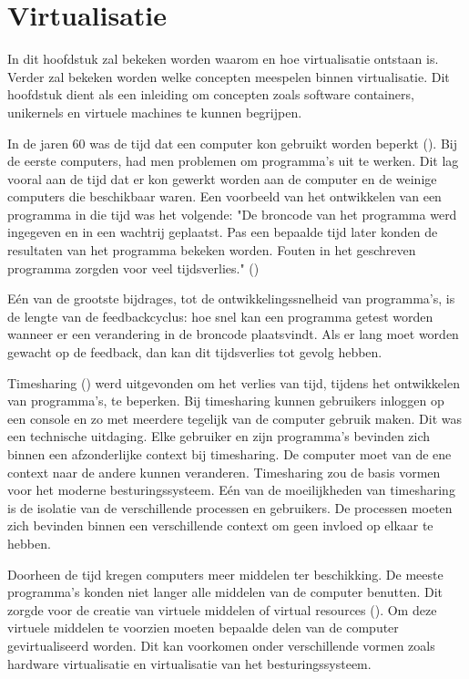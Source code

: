 \chapter{Virtualisatie}
\label{ch:virtualisatie}

In dit hoofdstuk zal bekeken worden waarom en hoe virtualisatie ontstaan is. Verder zal bekeken worden welke concepten meespelen binnen virtualisatie. Dit hoofdstuk dient als een inleiding om concepten zoals software containers, unikernels en virtuele machines te kunnen begrijpen.

In de jaren 60 was de tijd dat een computer kon gebruikt worden beperkt (\cite{conferences_modern_1968}). Bij de eerste computers, had men problemen om programma's uit te werken. Dit lag vooral aan de tijd dat er kon gewerkt worden aan de computer en de weinige computers die beschikbaar waren. Een voorbeeld van het ontwikkelen van een programma in die tijd was het volgende: "De broncode van het programma werd ingegeven en in een wachtrij geplaatst. Pas een bepaalde tijd later konden de resultaten van het programma bekeken worden. Fouten in het geschreven programma zorgden voor veel tijdsverlies." (\cite{conferences_modern_1968})

Eén van de grootste bijdrages, tot de ontwikkelingssnelheid van programma's, is de lengte van de feedbackcyclus: hoe snel kan een programma getest worden wanneer er een verandering in de broncode plaatsvindt. Als er lang moet worden gewacht op de feedback, dan kan dit tijdsverlies tot gevolg hebben.

Timesharing (\cite{pyke_jr._time-shared_1967}) werd uitgevonden om het verlies van tijd, tijdens het ontwikkelen van programma's, te beperken. Bij timesharing kunnen gebruikers inloggen op een console en zo met meerdere tegelijk van de computer gebruik maken. Dit was een technische uitdaging. Elke gebruiker en zijn programma's bevinden zich binnen een afzonderlijke context bij timesharing. De computer moet van de ene context naar de andere kunnen veranderen. Timesharing zou de basis vormen voor het moderne besturingssysteem. Eén van de moeilijkheden van timesharing is de isolatie van de verschillende processen en gebruikers. De processen moeten zich bevinden binnen een verschillende context om geen invloed op elkaar te hebben.

Doorheen de tijd kregen computers meer middelen ter beschikking. De meeste programma's konden niet langer alle middelen van de computer benutten. Dit zorgde voor de creatie van virtuele middelen of virtual resources (\cite{vakilinia_modeling_2015}). Om deze virtuele middelen te voorzien moeten bepaalde delen van de computer gevirtualiseerd worden. Dit kan voorkomen onder verschillende vormen zoals hardware virtualisatie en virtualisatie van het besturingssysteem.

